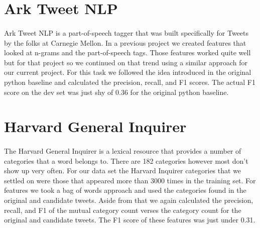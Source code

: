 \documentclass[11pt,letterpaper]{article}
\begin{document}


\section{Ark Tweet NLP}
\paragraph{}
Ark Tweet NLP is a part-of-speech tagger that was built specifically for Tweets by the folks at Carnegie Mellon. In a previous project we created features that looked at n-grams and the part-of-speech tags. Those features worked quite well but for that project so we continued on that trend using a similar approach for our current project. For this task we followed the idea introduced in the original python baseline and calculated the precision, recall, and F1 scores. The actual F1 score on the dev set was just shy of 0.36 for the original python baseline. %

\section{Harvard General Inquirer}
\paragraph{}
The Harvard General Inquirer is a lexical resource that provides a number of categories that a word belongs to. There are 182 categories however most don't show up very often. For our data set the Harvard Inquirer categories that we settled on were those that appeared more than 3000 times in the training set. For features we took a bag of words approach and used the categories found in the original and candidate tweets. Aside from that we again calculated the precision, recall, and F1 of the mutual category count verses the category count for the original and candidate tweets. The F1 score of these features was just under 0.31.
\end{document}
